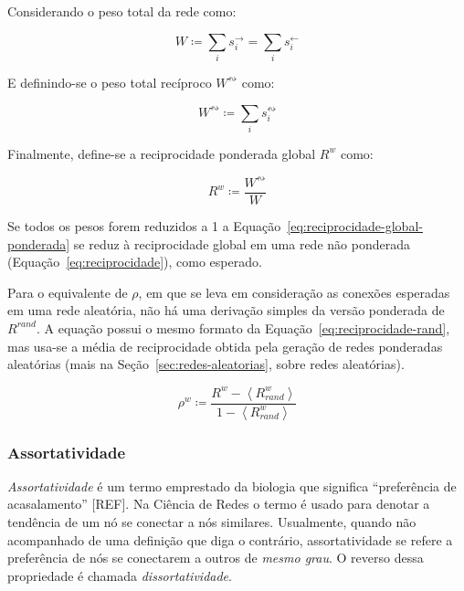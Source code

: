 \documentclass[12pt,a4paper,final]{article}
\newcommand{\avg}[1]{\left\langle #1 \right\rangle} %
\newcommand{\defn}{\coloneqq} %
\newcommand{\linkin}[1]{#1^\leftarrow} %
\newcommand{\linkout}[1]{#1^\rightarrow} %
\newcommand{\weighted}[1]{#1^w} %
\newcommand{\recboth}[1]{#1^\leftrightsquigarrow} %
\begin{document}
Considerando o peso total da rede como:

\begin{equation}
W \defn \sum_i \linkout{s}_i = \sum_i \linkin{s}_i
\end{equation}

E definindo-se o peso total recíproco $\recboth{W}$ como:

\begin{equation}
\recboth{W} \defn \sum_i \recboth{s}_i
\end{equation}

Finalmente, define-se a reciprocidade ponderada global $\weighted{R}$ como:

\begin{equation} \label{eq:reciprocidade-global-ponderada}
\weighted{R} \defn \frac{\recboth{W}}{W}
\end{equation}

Se todos os pesos forem reduzidos a 1 a Equação~\ref{eq:reciprocidade-global-ponderada} se reduz à reciprocidade global em uma rede não ponderada (Equação~\ref{eq:reciprocidade}), como esperado.

Para o equivalente de $\rho$, em que se leva em consideração as conexões esperadas em uma rede aleatória, não há uma derivação simples da versão ponderada de $R^\textit{rand}$. A equação possui o mesmo formato da Equação~\ref{eq:reciprocidade-rand}, mas usa-se a média de reciprocidade obtida pela geração de redes ponderadas aleatórias (mais na Seção~\ref{sec:redes-aleatorias}, sobre redes aleatórias).

\begin{equation}
\weighted{\rho} \defn \frac{\weighted{R} - \avg{\weighted{R}_\textit{rand}}}{1 -  \avg{\weighted{R}_\textit{rand}}}
\end{equation}

\subsubsection{Assortatividade} \label{sec:assortatividade}

\textit{Assortatividade} é um termo emprestado da biologia que significa \enquote{preferência de acasalamento} [REF]. Na Ciência de Redes o termo é usado para denotar a tendência de um nó se conectar a nós similares. Usualmente, quando não acompanhado de uma definição que diga o contrário, assortatividade se refere a preferência de nós se conectarem a outros de \textit{mesmo grau}. O reverso dessa propriedade é chamada \textit{dissortatividade}.
\end{document}
